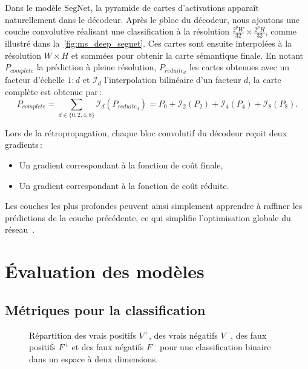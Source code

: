 Dans le modèle SegNet, la pyramide de cartes d'activations apparaît naturellement dans le décodeur. Après le $p$\ieme bloc du décodeur, nous ajoutons une couche convolutive réalisant une classification à la résolution $\frac{2^p W}{32} \times \frac{2^p H}{32}$, comme illustré dans la~\cref{fig:ms_deep_segnet}. Ces cartes sont ensuite interpolées à la résolution $W\times H$ et sommées pour obtenir la carte sémantique finale. En notant $P_{\mathit{compl\grave{e}te}}$ la prédiction à pleine résolution, $P_{\mathit{r\acute{e}duite}_d}$ les cartes obtenues avec un facteur d'échelle $1:d$ et $\mathcal{I}_d$ l'interpolation bilinéaire d'un facteur $d$, la carte complète est obtenue par\,:
\begin{equation}
P_{\mathit{compl\grave{e}te}} = \sum_{d \in \{0, 2, 4, 8\}} \mathcal{I}_d(P_{\mathit{r\acute{e}duite}_d}) = P_0 + \mathcal{I}_2(P_2) + \mathcal{I}_4(P_4) + \mathcal{I}_8(P_8).
\end{equation}

Lors de la rétropropagation, chaque bloc convolutif du décodeur reçoit deux gradients\,:
\begin{itemize}
	\item Un gradient correspondant à la fonction de coût finale,
  \item Un gradient correspondant à la fonction de coût réduite.
\end{itemize}
Les couches les plus profondes peuvent ainsi simplement apprendre à raffiner les prédictions de la couche précédente, ce qui simplifie l'optimisation globale du réseau~\cite{lin_refinenet_2016}.

\section{Évaluation des modèles}
\label{sec:metriques}

\subsection{Métriques pour la classification}

\def\tp{V^+}
\def\tn{V^-}
\def\fp{F^+}
\def\fn{F^-}

\begin{figure}
	\resizebox{\textwidth}{!}{%
	
	}
	\caption{Répartition des vrais positifs $\tp$, des vrais négatifs $\tn$, des faux positifs $\fp$ et des faux négatifs $\fn$ pour une classification binaire dans un espace à deux dimensions.}
	\label{fig:classification_binaire}
\end{figure}

